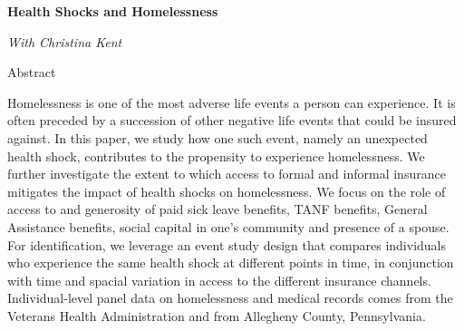 \documentclass[letterpaper,11pt]{article}
\begin{document}
\Large{\textbf{Health Shocks and Homelessness}}

\small{\textit{With Christina Kent}}


 \bigskip

Abstract

\medskip

Homelessness is one of the most adverse life events a person can experience. It is often preceded by a succession of other negative life events that could be insured against. In this paper, we study how one such event, namely an unexpected health shock, contributes to the propensity to experience homelessness. We further investigate the extent to which access to formal and informal insurance mitigates the impact of health shocks on homelessness. We focus on the role of access to and generosity of paid sick leave benefits, TANF benefits, General Assistance benefits, social capital in one’s community and presence of a spouse. For identification, we leverage an event study design that compares individuals who experience the same health shock at different points in time, in conjunction with time and spacial variation in access to the different insurance channels. Individual-level panel data on homelessness and medical records comes from the Veterans Health Administration and from Allegheny County, Pennsylvania.
\end{document}
